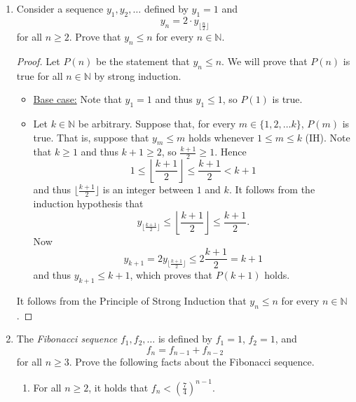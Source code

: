 \documentclass[11pt]{article}
\def\naturals{\mathbb{N}}
\begin{document}
\begin{enumerate}
\item Consider a sequence $y_1,y_2,\dots$ defined by $y_1=1$ and 
\[
 y_{n} = 2\cdot y_{\lfloor \frac{n}{2}\rfloor}
\]
for all $n\geq2$. Prove that $y_n\leq n$ for every $n\in\naturals$. 

\begin{Solution}
  \begin{proof}
  Let $P(n)$ be the statement that $y_n\leq n$. We will prove that $P(n)$ is true for all $n\in\naturals$ by strong induction.
  \begin{itemize}
   \item \underline{Base case:} Note that $y_1=1$ and thus $y_1\leq 1$, so $P(1)$ is true.
\item \underline{} Let $k\in\naturals$ be arbitrary. Suppose that, for every $m\in\{1,2,\dots k\}$,  $P(m)$ is true. That is, suppose that $y_m\leq m$ holds whenever $1\leq m\leq k$ (IH). Note that $k\geq1$ and thus $k+1\geq2$, so $\frac{k+1}{2}\geq 1$. Hence
\[
 1\leq \left\lfloor \frac{k+1}{2}\right \rfloor \leq \frac{k+1}{2} < k+1
\]
and thus $\lfloor \frac{k+1}{2} \rfloor$ is an integer between $1$ and $k$. It follows from the induction hypothesis that 
\[
 y_{\lfloor \frac{k+1}{2}\rfloor} \leq \left\lfloor \frac{k+1}{2}\right\rfloor \leq \frac{k+1}{2}.
\]
Now 
\[
 y_{k+1} = 2y_{\lfloor \frac{k+1}{2}\rfloor} \leq 2\frac{k+1}{2} = k+1
\]
and thus $y_{k+1}\leq k+1$, which proves that $P(k+1)$ holds.
  \end{itemize}
It follows from the Principle of Strong Induction that $y_{n}\leq n$ for every $n\in\naturals$.
 \end{proof}
\end{Solution}

\item The \emph{Fibonacci sequence} $f_1,f_2,\dots$ is defined by $f_1=1$, $f_2=1$, and 
\[
 f_{n} = f_{n-1} + f_{n-2}
\]
for all $n\geq 3$. Prove the following facts about the Fibonacci sequence.
\begin{enumerate}
 \item  For all $n\geq 2$, it holds that $f_n<\left(\frac{7}{4}\right)^{n-1}$.
 

\end{enumerate}
\end{enumerate}
\end{document}
